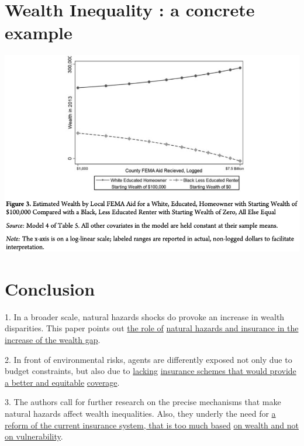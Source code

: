 \documentclass{beamer}
\begin{document}
\section{Wealth Inequality : a concrete example}
    \begin{frame}{\secname}
        \includegraphics[totalheight=7cm,width=1\textwidth]{pictures/Figure_3.png}
    \end{frame}

\section{Conclusion}
    \begin{frame}{\secname}
        1. In a broader scale, natural hazards shocks do provoke an increase in wealth disparities. 
        This paper points out \underline{the role of}
        \underline{natural hazards and insurance in the increase of the wealth gap}.

        2. In front of environmental risks, agents are differently exposed not only due to budget constraints,
        but also due to \underline{lacking} \underline{insurance schemes that would provide a better and equitable}
        \underline{coverage}.
        
        3. The authors call for further research on the precise mechanisms that make natural hazards affect
        wealth inequalities. Also, they underly the need for 
        \underline{a reform of the current insurance system, that 
        is too much based} \underline{on wealth and not on vulnerability}.
    \end{frame}
\end{document}
